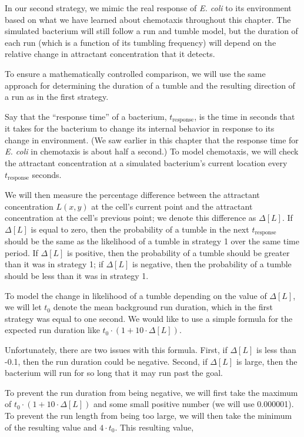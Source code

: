 In our second strategy, we mimic the real response of \textit{E. coli} to its environment based on what we have learned about chemotaxis throughout this chapter. The simulated bacterium will still follow a run and tumble model, but the duration of each run (which is a function of its tumbling frequency) will depend on the relative change in attractant concentration that it detects.

To ensure a mathematically controlled comparison, we will use the same approach for determining the duration of a tumble and the resulting direction of a run as in the first strategy.

Say that the ``response time'' of a bacterium, $t_{\text{response}}$, is the time in seconds that it takes for the bacterium to change its internal behavior in response to its change in environment. (We saw earlier in this chapter that the response time for \textit{E. coli} in chemotaxis is about half a second.) To model chemotaxis, we will check the attractant concentration at a simulated bacterium's current location every $t_{\text{response}}$ seconds.

We will then measure the percentage difference between the attractant concentration $L(x,y)$ at the cell's current point and the attractant concentration at the cell's previous point; we denote this difference as $\Delta[L]$. If $\Delta[L]$ is equal to zero, then the probability of a tumble in the next $t_{\text{response}}$ should be the same as the likelihood of a tumble in strategy 1 over the same time period. If $\Delta[L]$ is positive, then the probability of a tumble should be greater than it was in strategy 1; if $\Delta[L]$ is negative, then the probability of a tumble should be less than it was in strategy 1.

To model the change in likelihood of a tumble depending on the value of $\Delta[L]$, we will let $t_0$ denote the mean background run duration, which in the first strategy was equal to one second. We would like to use a simple formula for the expected run duration like $t_0 \cdot (1 + 10 \cdot \Delta[L])$.

Unfortunately, there are two issues with this formula. First, if $\Delta[L]$ is less than -0.1, then the run duration could be negative. Second, if $\Delta[L]$ is large, then the bacterium will run for so long that it may run past the goal.

To prevent the run duration from being negative, we will first take the maximum of $t_0 \cdot (1 + 10 \cdot \Delta [L])$ and some small positive number (we will use 0.000001). To prevent the run length from being too large, we will then take the minimum of the resulting value and $4 \cdot t_0$. This resulting value,

